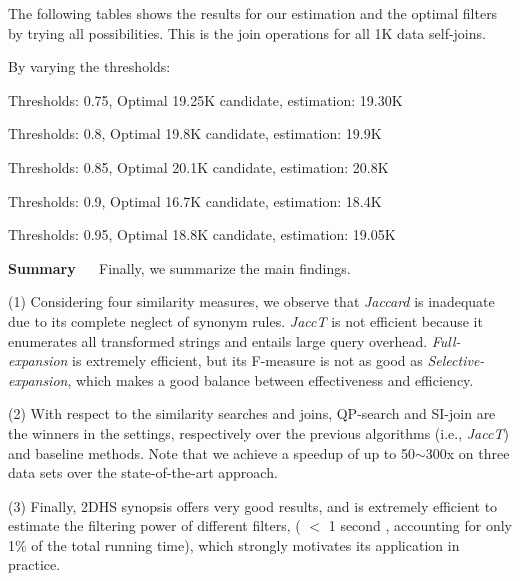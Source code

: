 The following tables shows the results for our estimation and the optimal filters by trying all possibilities. This is the join operations for all 1K data self-joins.

By varying the thresholds:

Thresholds: 0.75, Optimal 19.25K candidate, estimation: 19.30K

Thresholds: 0.8, Optimal 19.8K candidate, estimation: 19.9K

Thresholds: 0.85, Optimal 20.1K candidate, estimation: 20.8K

Thresholds: 0.9, Optimal 16.7K candidate, estimation: 18.4K

Thresholds: 0.95, Optimal 18.8K candidate, estimation: 19.05K

\noindent \textbf{Summary} ~~ Finally, we summarize the main findings.

(1) Considering four similarity measures, we observe that \textit{Jaccard} is inadequate due to its complete neglect of synonym rules. \textit{JaccT} is not efficient because it enumerates all transformed strings and entails large query overhead. \textit{Full-expansion} is extremely efficient, but its F-measure is not as good as \textit{Selective-expansion}, which makes a good balance between effectiveness and efficiency.

(2)	With respect to the similarity searches and joins,  QP-search and SI-join are the winners in the settings, respectively over the previous algorithms (i.e., \textit{JaccT}) and baseline methods. Note that we achieve a speedup of up to 50$\sim$300x on three data sets over the state-of-the-art approach.

(3) Finally, 2DHS synopsis offers very good results, and is extremely efficient to estimate the filtering power of different filters, ( $<$ 1 second ,  accounting for only 1\% of the total running time),  which strongly motivates its application in practice.

